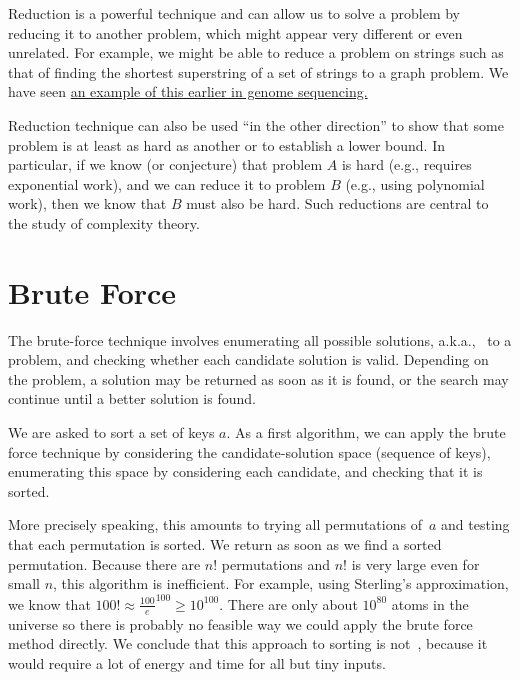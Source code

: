 \begin{remark}
Reduction is a powerful technique and can allow us to solve a problem
by reducing it to another problem, which might appear very different
or even unrelated.
%
For example, we might be able to reduce a problem on strings such as
that of finding the shortest superstring of a set of strings to a
graph problem.
%
We have seen \href{sec:genome::alg}{an example of this earlier in genome sequencing.}
%
\end{remark}

\begin{remark}
Reduction technique can also be used ``in the other direction'' to
show that some problem is at least as hard as another or to establish
a lower bound.
%
In particular, if we know (or conjecture) that problem $A$ is hard
(e.g., requires exponential work), and we can reduce it to problem $B$
(e.g., using polynomial work), then we know that $B$ must also be
hard. 
%
Such reductions are central to the study of complexity theory.
\end{remark}


\section{Brute Force}
\label{sec:design::bf}

\begin{gram}
The brute-force technique involves enumerating all possible solutions,
a.k.a.,~ to a problem, and checking whether
each candidate solution is valid.
%
Depending on the problem, a solution may be returned as soon as it is
found, or the search may continue until a better solution is found.
\end{gram}

\begin{example}
We are asked to sort a set of keys $a$.
%
As a first algorithm, we can apply the brute force technique by
considering the candidate-solution space (sequence of keys),
enumerating this space by considering each candidate, and checking
that it is sorted. 

More precisely speaking, this amounts to trying all permutations
of~$a$ and testing that each permutation is sorted. 
%
We return as soon as we find a sorted permutation.
%
Because there are $n!$ permutations and $n!$ is very large even
for small $n$, this algorithm is inefficient.
%
For example, using Sterling's approximation, 
we know that  $100! \approx \frac{100}{e}^{100} \ge 10^{100}$.
%
There are only about $10^{80}$ atoms in the universe so there is
probably no feasible way we could apply the brute force method
directly.
%
We conclude that this approach to sorting is
not~, because it would require a lot of energy and time for all but  tiny inputs.
\end{example}

